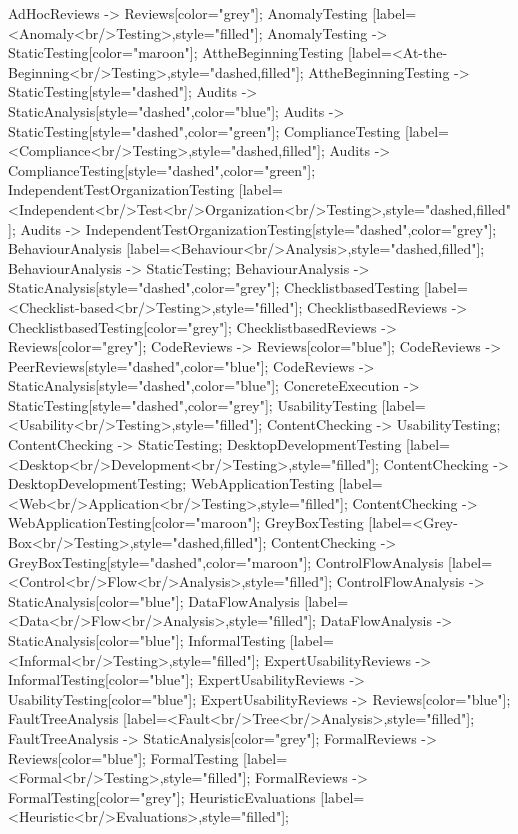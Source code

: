 \documentclass{article}
\begin{document}
{AdHocReviews -> Reviews[color="grey"];
AnomalyTesting [label=<Anomaly<br/>Testing>,style="filled"];
AnomalyTesting -> StaticTesting[color="maroon"];
AttheBeginningTesting [label=<At-the-Beginning<br/>Testing>,style="dashed,filled"];
AttheBeginningTesting -> StaticTesting[style="dashed"];
Audits -> StaticAnalysis[style="dashed",color="blue"];
Audits -> StaticTesting[style="dashed",color="green"];
ComplianceTesting [label=<Compliance<br/>Testing>,style="dashed,filled"];
Audits -> ComplianceTesting[style="dashed",color="green"];
IndependentTestOrganizationTesting [label=<Independent<br/>Test<br/>Organization<br/>Testing>,style="dashed,filled"];
Audits -> IndependentTestOrganizationTesting[style="dashed",color="grey"];
BehaviourAnalysis [label=<Behaviour<br/>Analysis>,style="dashed,filled"];
BehaviourAnalysis -> StaticTesting;
BehaviourAnalysis -> StaticAnalysis[style="dashed",color="grey"];
ChecklistbasedTesting [label=<Checklist-based<br/>Testing>,style="filled"];
ChecklistbasedReviews -> ChecklistbasedTesting[color="grey"];
ChecklistbasedReviews -> Reviews[color="grey"];
CodeReviews -> Reviews[color="blue"];
CodeReviews -> PeerReviews[style="dashed",color="blue"];
CodeReviews -> StaticAnalysis[style="dashed",color="blue"];
ConcreteExecution -> StaticTesting[style="dashed",color="grey"];
UsabilityTesting [label=<Usability<br/>Testing>,style="filled"];
ContentChecking -> UsabilityTesting;
ContentChecking -> StaticTesting;
DesktopDevelopmentTesting [label=<Desktop<br/>Development<br/>Testing>,style="filled"];
ContentChecking -> DesktopDevelopmentTesting;
WebApplicationTesting [label=<Web<br/>Application<br/>Testing>,style="filled"];
ContentChecking -> WebApplicationTesting[color="maroon"];
GreyBoxTesting [label=<Grey-Box<br/>Testing>,style="dashed,filled"];
ContentChecking -> GreyBoxTesting[style="dashed",color="maroon"];
ControlFlowAnalysis [label=<Control<br/>Flow<br/>Analysis>,style="filled"];
ControlFlowAnalysis -> StaticAnalysis[color="blue"];
DataFlowAnalysis [label=<Data<br/>Flow<br/>Analysis>,style="filled"];
DataFlowAnalysis -> StaticAnalysis[color="blue"];
InformalTesting [label=<Informal<br/>Testing>,style="filled"];
ExpertUsabilityReviews -> InformalTesting[color="blue"];
ExpertUsabilityReviews -> UsabilityTesting[color="blue"];
ExpertUsabilityReviews -> Reviews[color="blue"];
FaultTreeAnalysis [label=<Fault<br/>Tree<br/>Analysis>,style="filled"];
FaultTreeAnalysis -> StaticAnalysis[color="grey"];
FormalReviews -> Reviews[color="blue"];
FormalTesting [label=<Formal<br/>Testing>,style="filled"];
FormalReviews -> FormalTesting[color="grey"];
HeuristicEvaluations [label=<Heuristic<br/>Evaluations>,style="filled"];
}
\end{document}
